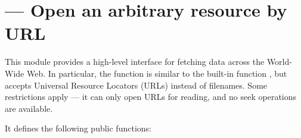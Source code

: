 \section{ ---
         Open an arbitrary resource by URL}




This module provides a high-level interface for fetching data across
the World-Wide Web.  In particular, the  function
is similar to the built-in function , but accepts
Universal Resource Locators (URLs) instead of filenames.  Some
restrictions apply --- it can only open URLs for reading, and no seek
operations are available.

It defines the following public functions:


